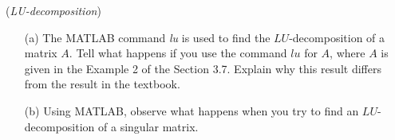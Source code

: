 \vspace{3mm}
\begin{exer} (\textit{LU-decomposition})
\begin{enumerate}
\item[(a)] The MATLAB command \textit{lu} is used to find the $LU$-decomposition of a matrix $A$. Tell what happens if you use the command $lu$ for $A$, where $A$ is given in the Example 2 of the Section 3.7. Explain why this result differs from the result in the textbook.
\vspace{1mm}
\item[(b)] Using MATLAB, observe what happens when you try to find an $LU$-decomposition of a singular matrix.

\end{enumerate}
\end{exer}


